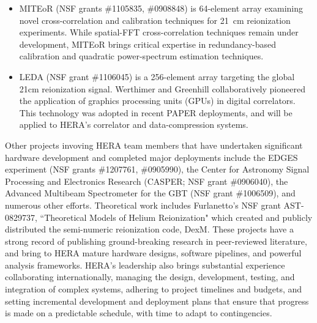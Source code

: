 \documentclass[preprint]{aastex}
\begin{document}
\begin{itemize}[noitemsep,nolistsep]
\item{MITEoR} (NSF grants \#1105835, \#0908848) is 64-element array 
examining novel cross-correlation and calibration techniques for 21~cm reionization experiments.
While spatial-FFT cross-correlation
techniques remain under development, MITEoR brings critical expertise in redundancy-based calibration
and quadratic power-spectrum estimation techniques.

\item{LEDA} (NSF grant \#1106045) is a 256-element array targeting the
global 21cm reionization signal.  Werthimer and Greenhill collaboratively 
pioneered the application of graphics processing units (GPUs) in digital correlators.
This technology was adopted in recent PAPER deployments, and will be applied to HERA's correlator
and data-compression systems.

\end{itemize}

\noindent
Other projects invoving HERA team members that have undertaken significant hardware development and
completed major deployments include the EDGES experiment (NSF grants \#1207761, \#0905990),
the Center for Astronomy Signal Processing and Electronics Research (CASPER; NSF grant \#0906040), the Advanced Multibeam
Spectrometer for the GBT (NSF grant \#1006509), and numerous other efforts.  Theoretical work includes Furlanetto's 
NSF grant AST-0829737, ``Theoretical Models of Helium Reionization"  
which created and publicly distributed the semi-numeric reionization code, DexM.
These projects have a strong record of publishing ground-breaking research in peer-reviewed literature, and
bring to HERA mature hardware designs, software pipelines, and powerful analysis frameworks.
HERA's leadership also brings substantial experience
collaborating internationally, managing the design, development, testing, and integration of complex systems,
adhering to project timelines and budgets, and setting incremental development and deployment plans that
ensure that progress is made on a predictable schedule, with time to adapt to contingencies.

\end{document}
